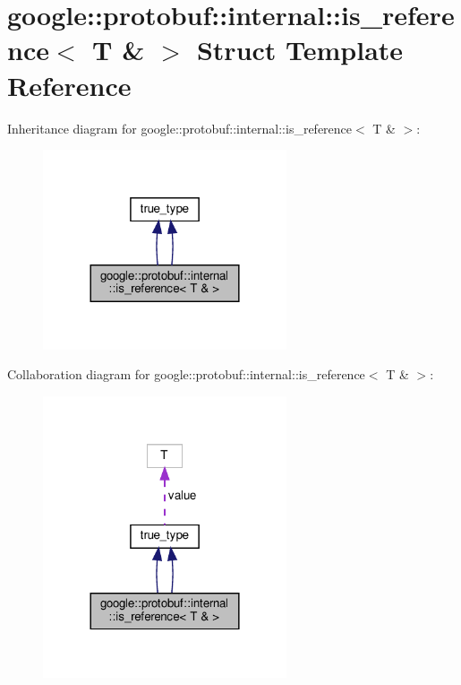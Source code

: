 \hypertarget{structgoogle_1_1protobuf_1_1internal_1_1is__reference_3_01T_01_6_01_4}{}\section{google\+:\+:protobuf\+:\+:internal\+:\+:is\+\_\+reference$<$ T \& $>$ Struct Template Reference}
\label{structgoogle_1_1protobuf_1_1internal_1_1is__reference_3_01T_01_6_01_4}


Inheritance diagram for google\+:\+:protobuf\+:\+:internal\+:\+:is\+\_\+reference$<$ T \& $>$\+:
\nopagebreak
\begin{figure}[H]
\begin{center}
\leavevmode
\includegraphics[width=204pt]{structgoogle_1_1protobuf_1_1internal_1_1is__reference_3_01T_01_6_01_4__inherit__graph}
\end{center}
\end{figure}


Collaboration diagram for google\+:\+:protobuf\+:\+:internal\+:\+:is\+\_\+reference$<$ T \& $>$\+:
\nopagebreak
\begin{figure}[H]
\begin{center}
\leavevmode
\includegraphics[width=204pt]{structgoogle_1_1protobuf_1_1internal_1_1is__reference_3_01T_01_6_01_4__coll__graph}
\end{center}
\end{figure}
